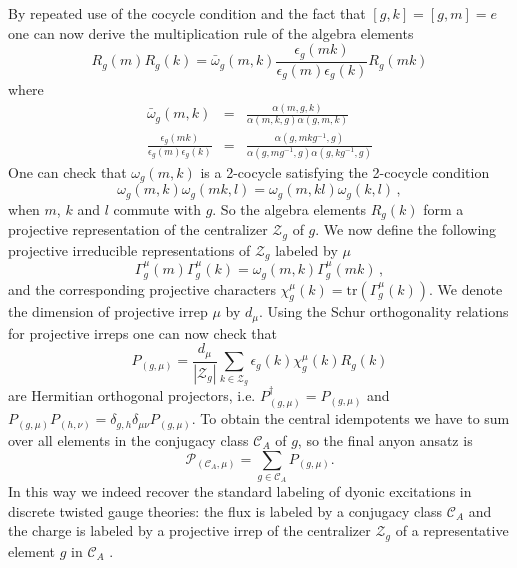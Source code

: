 \documentclass[12 pt]{article}
\begin{document}
By repeated use of the cocycle condition and the fact that $[g,k]=[g,m]=e$ one can now derive the multiplication rule of the algebra elements
\begin{equation} \label{groupmultiplication}
R_g(m)R_g(k) =  \bar{\omega}_g(m,k) \frac{\epsilon_g(mk)}{\epsilon_g(m)\epsilon_g(k)}R_g(mk)
\end{equation}
where
\begin{eqnarray}
\bar{\omega}_g(m,k) &  = &  \frac{\alpha(m,g,k)}{\alpha(m,k,g)\alpha(g,m,k)} \nonumber \\
 \frac{\epsilon_g(mk)}{\epsilon_g(m)\epsilon_g(k)} & = & \frac{\alpha(g,mkg^{-1},g)}{\alpha(g,mg^{-1},g)\alpha(g,kg^{-1},g)}
\end{eqnarray}
One can check that $\omega_g(m,k)$ is a 2-cocycle satisfying the 2-cocycle condition
\begin{equation}
\omega_g(m,k)\omega_g(mk,l) = \omega_g(m,kl)\omega_g(k,l)\, ,
\end{equation}
when $m$, $k$ and $l$ commute with $g$. So the algebra elements $R_g(k)$ form a projective representation of the centralizer $\mathcal{Z}_g$ of $g$. We now define the following projective irreducible representations of $\mathcal{Z}_g$ labeled by $\mu$
\begin{equation}
\Gamma^\mu_g(m) \Gamma^\mu_g(k) = \omega_g(m,k) \Gamma_g^\mu(mk)\, ,
\end{equation}
and the corresponding projective characters $\chi^\mu_g(k) = \text{tr}(\Gamma^\mu_g(k))$. We denote the dimension of projective irrep $\mu$ by $d_\mu$. Using the Schur orthogonality relations for projective irreps one can now check that
\begin{equation}
P_{(g,\mu)} = \frac{d_\mu}{|\mathcal{Z}_g|}\sum_{k\in\mathcal{Z}_g} \epsilon_g(k) \chi^\mu_g(k)R_g(k)
\end{equation}
are Hermitian orthogonal projectors, i.e. $P_{(g,\mu)}^\dagger =  P_{(g,\mu)}$ and $P_{(g,\mu)}P_{(h,\nu)} = \delta_{g,h}\delta_{\mu\nu} P_{(g,\mu)}$. To obtain the central idempotents we have to sum over all elements in the conjugacy class $\mathcal{C}_A$ of $g$, so the final anyon ansatz is
\begin{equation}
\mathcal{P}_{(\mathcal{C}_A,\mu)} = \sum_{g\in \mathcal{C}_A} P_{(g,\mu)}.
\end{equation}
In this way we indeed recover the standard labeling of dyonic excitations in discrete twisted gauge theories: the flux is labeled by a conjugacy class $\mathcal{C}_A$ and the charge is labeled by a projective irrep of the centralizer $\mathcal{Z}_g$ of a representative element $g$ in $\mathcal{C}_A$ \cite{orbifold,DijkgraafPasquierRoche}.
\end{document}
